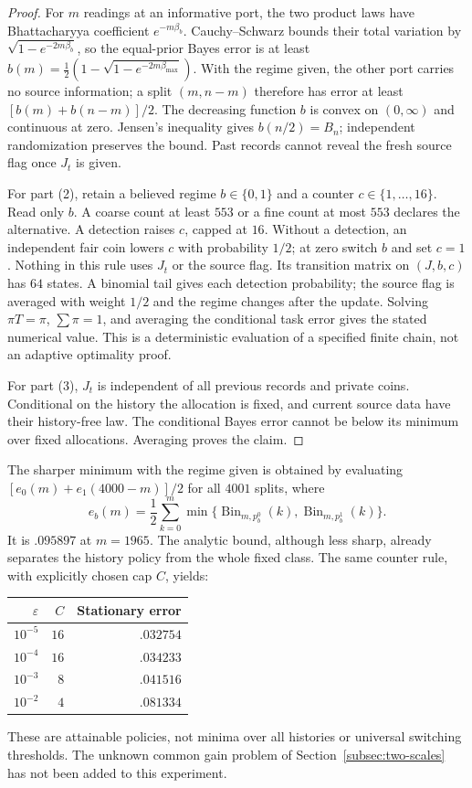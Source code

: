 \documentclass[12pt,a4paper]{article}
\begin{document}
\begin{proof}
For $m$ readings at an informative port, the two product laws have
Bhattacharyya coefficient $e^{-m\beta_b}$. Cauchy--Schwarz bounds
their total variation by $\sqrt{1-e^{-2m\beta_b}}$, so the equal-prior
Bayes error is at least
$b(m)=\frac12(1-\sqrt{1-e^{-2m\beta_{\max}}})$.
With the regime given, the other port carries no source information;
a split $(m,n-m)$ therefore has error at least
$[b(m)+b(n-m)]/2$. The decreasing function $b$ is convex on
$(0,\infty)$ and continuous at zero. Jensen's inequality gives
$b(n/2)=B_n$; independent randomization preserves the bound.
Past records cannot reveal the fresh source flag once $J_t$ is given.

For part (2), retain a believed regime $b\in\{0,1\}$ and a counter
$c\in\{1,\ldots,16\}$. Read only $b$. A coarse count at least $553$
or a fine count at most $553$ declares the alternative. A detection
raises $c$, capped at $16$. Without a detection, an independent fair
coin lowers $c$ with probability $1/2$; at zero switch $b$ and set
$c=1$. Nothing in this rule uses $J_t$ or the source flag. Its
transition matrix on $(J,b,c)$ has $64$ states. A binomial tail gives
each detection probability; the source flag is averaged with weight
$1/2$ and the regime changes after the update. Solving
$\pi T=\pi$, $\sum\pi=1$, and averaging the conditional task error
gives the stated numerical value. This is a deterministic evaluation
of a specified finite chain, not an adaptive optimality proof.

For part (3), $J_t$ is independent of all previous records and
private coins. Conditional on the history the allocation is fixed,
and current source data have their history-free law. The conditional
Bayes error cannot be below its minimum over fixed allocations.
Averaging proves the claim.
\end{proof}

The sharper minimum with the regime given is obtained by evaluating
$[e_0(m)+e_1(4000-m)]/2$ for all $4001$ splits, where
\[
 e_b(m)=\frac12\sum_{k=0}^{m}\min\{
 \operatorname{Bin}_{m,p_b^0}(k),
 \operatorname{Bin}_{m,p_b^1}(k)\}.
\]
It is $.095897$ at $m=1965$. The analytic bound, although less sharp,
already separates the history policy from the whole fixed class.
The same counter rule, with explicitly chosen cap $C$, yields:
\begin{center}\small
\begin{tabular}{rrr}
\toprule
$\varepsilon$ & $C$ & Stationary error\\
\midrule
$10^{-5}$ & $16$ & $.032754$\\
$10^{-4}$ & $16$ & $.034233$\\
$10^{-3}$ & $8$ & $.041516$\\
$10^{-2}$ & $4$ & $.081334$\\
\bottomrule
\end{tabular}
\end{center}
These are attainable policies, not minima over all histories or
universal switching thresholds. The unknown common gain problem of
Section~\ref{subsec:two-scales} has not been added to this experiment.
\end{document}

